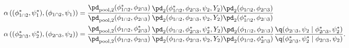 \begin{align}
  \alpha \left((\phi_{1 \cap 2}^{*}, \psi_{1}^{*}), (\phi_{1 \cap 2}, \psi_{1})\right) &= 
  \frac {
    \pd_{\text{pool}, 2}(\phi_{1 \cap 2}^{*}, \phi_{2 \cap 3})
  } {
    \pd_{\text{pool}, 2}(\phi_{1 \cap 2}, \phi_{2 \cap 3})
  }
  \frac {
    \pd_{2}(\phi_{1 \cap 2}^{*}, \phi_{2 \cap 3}, \psi_{2}, Y_{2})
    \pd_{2}(\phi_{1 \cap 2}, \phi_{2 \cap 3})
  } {
    \pd_{2}(\phi_{1 \cap 2}, \phi_{2 \cap 3}, \psi_{2}, Y_{2})
    \pd_{2}(\phi_{1 \cap 2}^{*}, \phi_{2 \cap 3})
  } 
  \label{eqn:stage-two-acceptance-probabilities-one}
  \\
  \alpha \left((\phi_{2 \cap 3}^{*}, \psi_{2}^{*}), (\phi_{2 \cap 3}, \psi_{2})\right) &= 
  \frac {
    \pd_{\text{pool}, 2}(\phi_{1 \cap 2}, \phi_{2 \cap 3}^{*})
  } {
    \pd_{\text{pool}, 2}(\phi_{1 \cap 2}, \phi_{2 \cap 3})
  }
  \frac {
    \pd_{2}(\phi_{1 \cap 2}, \phi_{2 \cap 3}^{*}, \psi_{2}^{*}, Y_{2})
    \pd_{2}(\phi_{1 \cap 2}, \phi_{2 \cap 3})
  } {
    \pd_{2}(\phi_{1 \cap 2}, \phi_{2 \cap 3}, \psi_{2}, Y_{2})
    \pd_{2}(\phi_{1 \cap 2}, \phi_{2 \cap 3}^{*})
  }
  \frac {
    \q(\phi_{2 \cap 3}, \psi_{2} \mid \phi_{2 \cap 3}^{*}, \psi_{2}^{*})
  } {
    \q(\phi_{2 \cap 3}^{*}, \psi_{2}^{*} \mid \phi_{2 \cap 3}, \psi_{2})
  }.
  \label{eqn:stage-two-acceptance-probabilities-two}
\end{align}